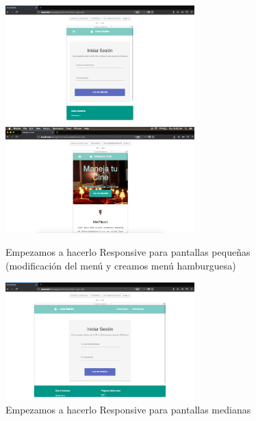 \documentclass[12pt, fleqn]{report}                             %
\begin{document}
        \begin{figure}[ht]
            \centering
            \includegraphics[width=0.65\textwidth]{EjemploInterfazSegundaParte5}
            \includegraphics[width=0.65\textwidth]{EjemploInterfazSegundaParte7}
            \caption{Empezamos a hacerlo Responsive para pantallas pequeñas (modificación del menú y creamos menú hamburguesa)}
        \end{figure}


        \begin{figure}[ht]
            \centering
            \includegraphics[width=0.65\textwidth]{EjemploInterfazSegundaParte6}
            \caption{Empezamos a hacerlo Responsive para pantallas medianas}
        \end{figure}



    
\end{document}
